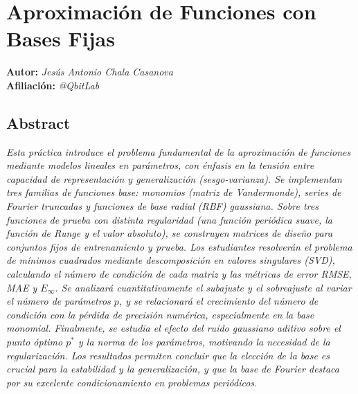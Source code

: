 %
\chapter{Aproximación de Funciones con Bases Fijas}
\label{chap:aproximacion}

\textcolor{CtpMauve}{\textbf{Autor:}} \textit{Jesús Antonio Chala Casanova}\\[2pt]
\textcolor{CtpMauve}{\textbf{Afiliación:}} \textit{@QbitLab}

\section*{Abstract}
\label{sec:abstract}

\textit{Esta práctica introduce el problema fundamental de la aproximación de funciones mediante modelos lineales en parámetros, con énfasis en la tensión entre capacidad de representación y generalización (sesgo-varianza). Se implementan tres familias de funciones base: monomios (matriz de Vandermonde), series de Fourier truncadas y funciones de base radial (RBF) gaussiana. Sobre tres funciones de prueba con distinta regularidad (una función periódica suave, la función de Runge y el valor absoluto), se construyen matrices de diseño para conjuntos fijos de entrenamiento y prueba. Los estudiantes resolverán el problema de mínimos cuadrados mediante descomposición en valores singulares (SVD), calculando el número de condición de cada matriz y las métricas de error RMSE, MAE y \(E_\infty\). Se analizará cuantitativamente el subajuste y el sobreajuste al variar el número de parámetros \(p\), y se relacionará el crecimiento del número de condición con la pérdida de precisión numérica, especialmente en la base monomial. Finalmente, se estudia el efecto del ruido gaussiano aditivo sobre el punto óptimo \(p^*\) y la norma de los parámetros, motivando la necesidad de la regularización. Los resultados permiten concluir que la elección de la base es crucial para la estabilidad y la generalización, y que la base de Fourier destaca por su excelente condicionamiento en problemas periódicos.}

